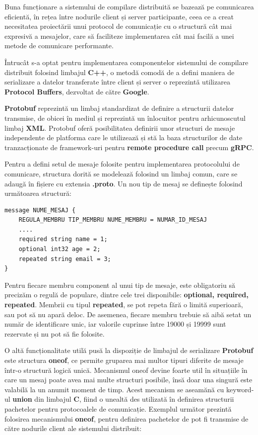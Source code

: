 Buna funcționare a sistemului de compilare distribuită se bazează pe comunicarea eficientă, în rețea între nodurile client și server
participante, ceea ce a creat necesitatea proiectării unui protocol de comunicație cu o structură cât mai expresivă a mesajelor, care să
faciliteze implementarea cât mai facilă a unei metode de comunicare performante. 

Întrucât s-a optat pentru implementarea componentelor sistemului de compilare distribuit folosind limbajul \textbf{C++}, o metodă comodă
de a defini maniera de serializare a datelor transferate între client și server o reprezintă utilizarea \textbf{Protocol Buffers}\cite{varda2008protocolbuffers},
dezvoltat de către \textbf{Google}.

\textbf{Protobuf} reprezintă un limbaj standardizat de definire a structurii datelor transmise, de obicei în mediul  și reprezintă
un înlocuitor pentru arhicunoscutul limbaj \textbf{XML}. Protobuf oferă posibilitatea definirii unor structuri de mesaje independente de platforma
care le utilizează și stă la baza structurilor de date tranzacționate de framework-uri pentru \textbf{remote procedure call} precum \textbf{gRPC}\cite{indrasiri2020grpc}.

Pentru a defini setul de mesaje folosite pentru implementarea protocolului de comunicare, structura dorită se modelează folosind un limbaj comun,
care se adaugă în fișiere cu extensia \textbf{.proto}. Un nou tip de mesaj se definește folosind următoarea structură:

\begin{lstlisting}[language={},caption={Definiția unui mesaj în Protobuf},label={lst:protobuf_example}]
message NUME_MESAJ {
    REGULA_MEMBRU TIP_MEMBRU NUME_MEMBRU = NUMAR_ID_MESAJ
    ....
    required string name = 1;
    optional int32 age = 2;
    repeated string email = 3;
}
\end{lstlisting}

Pentru fiecare membru component al unui tip de mesaje, este obligatoriu să precizăm o regulă de populare, dintre cele trei disponibile:
\textbf{optional, required, repeated}. Membrii cu tipul \textbf{repeated}, se pot repeta fără o limită superioară, sau pot să nu apară deloc.
De asemenea, fiecare membru trebuie să aibă setat un număr de identificare unic, iar valorile cuprinse între 19000 și 19999 sunt rezervate și
nu pot să fie folosite.

O altă funcționalitate utilă pusă la dispoziție de limbajul de serializare \textbf{Protobuf} este structura \textbf{oneof}, ce permite gruparea
mai multor tipuri diferite de mesaje într-o structură logică unică. Mecanismul oneof devine foarte util în situațiile în care un mesaj
poate avea mai multe structuri posibile, însă doar una singură este valabilă la un anumit moment de timp. Acest mecanism se aseamănă cu 
keyword-ul \textbf{union} din limbajul \textbf{C}\cite{ritchie1978c}, fiind o unealtă des utilizată în definirea structurii pachetelor
pentru protocoalele de comunicație. Exemplul următor prezintă folosirea mecanismului \textbf{oneof}, pentru definirea pachetelor de pot fi transmise
de către nodurile client ale sistemului distribuit:

